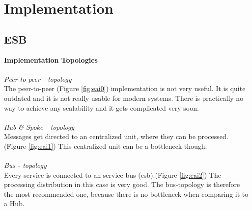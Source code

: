 \documentclass[12pt]{article}
\begin{document}

\newpage

\section{Implementation}
\subsection{ESB}
\label{sec:esb}
\textbf{Implementation Topologies} \\ \\
\textit{Peer-to-peer - topology}\\
The peer-to-peer (Figure \ref{fig:eai0}) implementation is not very useful. It is quite outdated and it is not really usable for modern systems.
There is practically no way to achieve any scalability and it gets complicated very soon. \\\\
\textit{Hub \& Spoke  - topology}\\
Messages get directed to an centralized unit, where they can be processed. (Figure \ref{fig:eai1}) This centralized unit can be a bottleneck though. \\\\
\textit{Bus - topology}\\
Every service is connected to an service bus (\gls{esb}).(Figure \ref{fig:eai2}) The processing distribution in this case is very good. The bus-topology is therefore the most recommended one, because there is no bottleneck when comparing it to a Hub.
\end{document}
